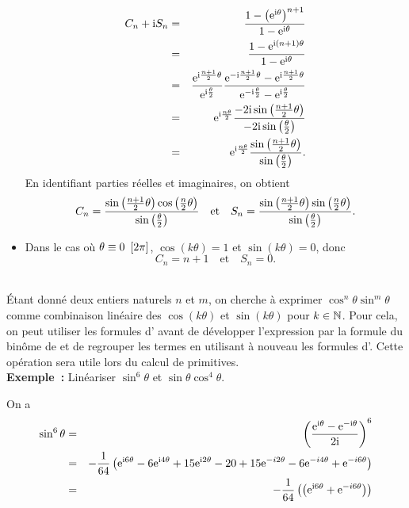 \documentclass{magnoliaold}
\begin{document}
\begin{applications}
\begin{sol}
\begin{itemize}
\begin{eqnarray*}
    C_n+{\rm i} S_n &=& \frac{1-\left({\rm e}^{{\rm i}\theta}\right)^{n+1}}{1-{\rm e}^{{\rm i}\theta}}\\
             &=& \frac{1-{\rm e}^{{\rm i} \left(n+1\right)\theta}}{1-{\rm e}^{{\rm i}\theta}}\\
             &=& \frac{{\rm e}^{{\rm i}\frac{n+1}{2}\theta}}{{\rm e}^{{\rm i}\frac{\theta}{2}}}
                 \frac{{\rm e}^{-{\rm i}\frac{n+1}{2}\theta}-{\rm e}^{{\rm i}\frac{n+1}{2}\theta}}
                      {{\rm e}^{-{\rm i}\frac{\theta}{2}}-{\rm e}^{{\rm i}\frac{\theta}{2}}}\\
             &=& {\rm e}^{{\rm i}\frac{n\theta}{2}}\frac{-2{\rm i}\sin\left(\frac{n+1}{2}\theta\right)}
                 {-2{\rm i}\sin\left(\frac{\theta}{2}\right)}\\
             &=& {\rm e}^{{\rm i}\frac{n\theta}{2}}\frac{\sin\left(\frac{n+1}{2}\theta\right)}
                 {\sin\left(\frac{\theta}{2}\right)}.
    \end{eqnarray*}
    En identifiant parties réelles et imaginaires, on obtient
    $$C_n=\frac{\sin\left(\frac{n+1}{2}\theta\right)\cos\left(\frac{n}{2}\theta\right)}
          {\sin\left(\frac{\theta}{2}\right)} \quad \text{et} \quad
      S_n=\frac{\sin\left(\frac{n+1}{2}\theta\right)\sin\left(\frac{n}{2}\theta\right)}
          {\sin\left(\frac{\theta}{2}\right)}.$$
  \item Dans le cas où $\theta\equiv 0\ \cro{2\pi}$, $\cos (k\theta)=1$ et
    $\sin(k\theta)=0$, donc
    $$C_n=n+1 \quad \text{et} \quad S_n=0.$$
  \end{itemize}      
  \end{sol}
\\
  Étant donné deux entiers naturels $n$ et $m$, on cherche à exprimer
  $\cos^n \theta \sin^m \theta$ comme combinaison linéaire des $\cos(k\theta)$
  et $\sin(k\theta)$ pour $k\in\mathbb{N}$. Pour cela, on peut utiliser les formules
  d' avant de développer l'expression par la formule
  du binôme de  et de regrouper les termes en utilisant à nouveau
  les formules d'. Cette opération sera utile lors
  du calcul de primitives.\\
  {\bf Exemple~:} Linéariser $\sin^6 \theta$ et $\sin\theta \cos^4 \theta$.
    \begin{sol}
    On a
    \begin{eqnarray*}
    \sin^6 \theta &=& \left(\frac{{\rm e}^{{\rm i}\theta}-{\rm e}^{-{\rm i}\theta}}{2{\rm i}}\right)^6\\
    &=& -\frac{1}{64}\left({\rm e}^{{\rm i} 6\theta}-6{\rm e}^{{\rm i} 4\theta}+15{\rm e}^{{\rm i} 2\theta}-20
                        +15{\rm e}^{-i2\theta}-6{\rm e}^{-i4\theta}+{\rm e}^{-i6\theta}\right)\\
    &=& -\frac{1}{64}\left(\left({\rm e}^{{\rm i} 6\theta}+{\rm e}^{-i6\theta}\right)
\right)
\end{eqnarray*}
\end{sol}
\end{applications}
\end{document}
